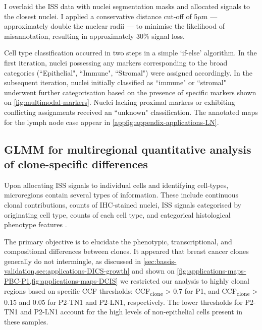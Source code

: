 I overlaid the \ac{ISS} data with nuclei segmentation masks and allocated signals to the closest nuclei. I applied a conservative distance cut-off of 5$\mu$m — approximately double the nuclear radii — to minimise the likelihood of misannotation, resulting in approximately 30\% signal loss.

Cell type classification occurred in two steps in a simple `if-else' algorithm. In the first iteration, nuclei possessing any markers corresponding to the broad categories (``Epithelial", ``Immune", ``Stromal") were assigned accordingly. In the subsequent iteration, nuclei initially classified as ``immune" or ``stromal" underwent further categorisation based on the presence of specific markers shown on \cref{fig:multimodal-markers}. Nuclei lacking proximal markers or exhibiting conflicting assignments received an ``unknown" classification. The annotated maps for the lymph node case appear in \cref{appfig:appendix-applications-LN}.


\subsection{\acs{GLMM} for multiregional quantitative analysis of clone-specific differences}
\label{sec:modalities-glmm}

Upon allocating \ac{ISS} signals to individual cells and identifying cell-types, microregions contain several types of information. These include continuous clonal contributions, counts of \ac{IHC}-stained nuclei, \ac{ISS} signals categorised by originating cell type, counts of each cell type, and categorical histological phenotype features .

The primary objective is to elucidate the phenotypic, transcriptional, and compositional differences between clones. It appeared that breast cancer clones generally do not intermingle, as discussed in \cref{sec:bassis-validation,sec:applications-DICS-growth} and shown on \cref{fig:applications-maps-PBC-P1,fig:applications-maps-DCIS} we restricted our analysis to highly clonal regions based on specific \ac{CCF} thresholds: \ac{CCF}\textsubscript{clone} > 0.7 for P1, and \ac{CCF}\textsubscript{clone} > 0.15 and 0.05 for P2-TN1 and P2-LN1, respectively. The lower thresholds for P2-TN1 and P2-LN1 account for the high levels of non-epithelial cells present in these samples.

